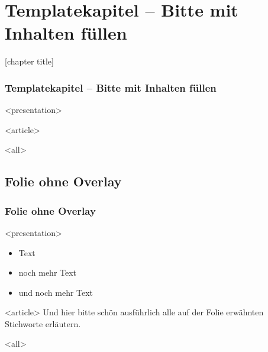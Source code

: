 
\section{Templatekapitel -- Bitte mit Inhalten füllen}

{%
[chapter title]
\begin{frame}[fragile]
\frametitle<presentation>{Templatekapitel -- Bitte mit Inhalten füllen}




\mode
<presentation>

\mode
<article>


\mode
<all>

\end{frame}
}
\newpage

\subsection{Folie ohne Overlay}

\begin{frame}[fragile]
\frametitle<presentation>{Folie ohne Overlay}


\mode
<presentation>
\begin{itemize}
 \item Text
 \item noch mehr Text
 \item und noch mehr Text
\end{itemize}


\mode
<article>
Und hier bitte schön ausführlich alle auf der Folie erwähnten Stichworte erläutern.



\mode
<all>

\end{frame}
\newpage



